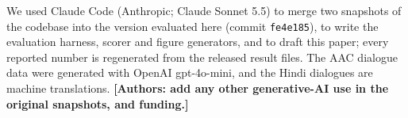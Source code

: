 We used Claude Code (Anthropic; Claude Sonnet 5.5) to merge two snapshots of the codebase into the version evaluated here (commit \texttt{fe4e185}), to write the evaluation harness, scorer and figure generators, and to draft this paper; every reported number is regenerated from the released result files.
The AAC dialogue data were generated with OpenAI gpt-4o-mini, and the Hindi dialogues are machine translations.
\textbf{[Authors: add any other generative-AI use in the original snapshots, and funding.]}
